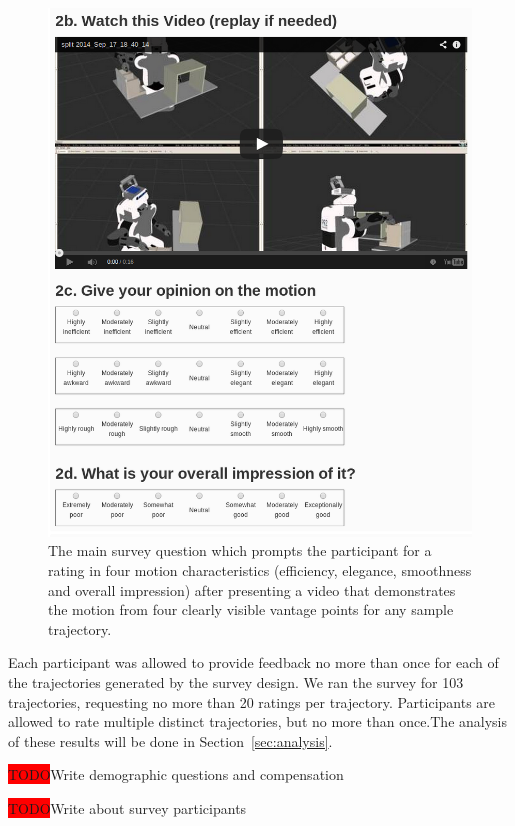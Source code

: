 \documentclass[letterpaper, 10 pt, conference]{ieeeconf}  %
\newcommand{\todo}{\colorbox{red}{TODO}}
\begin{document}
\begin{figure}
    \includegraphics[trim = 0mm 0mm 0mm 0mm, width=\columnwidth]{pictures/amazon_survey_screenshot}
    \caption{The main survey question which prompts the participant for a rating in four motion characteristics (efficiency, elegance, smoothness and overall impression) after presenting a video that demonstrates the motion from four clearly visible vantage points for any sample trajectory.}
    \label{fig:survey_question}
\end{figure}

Each participant was allowed to provide feedback no more than once for each of the trajectories generated by the survey design. We ran the survey for 103 trajectories, requesting no more than 20 ratings per trajectory. Participants are allowed to rate multiple distinct trajectories, but no more than once.The analysis of these results will be done in Section~\ref{sec:analysis}.

\todo Write demographic questions and compensation

\todo Write about survey participants
\end{document}
